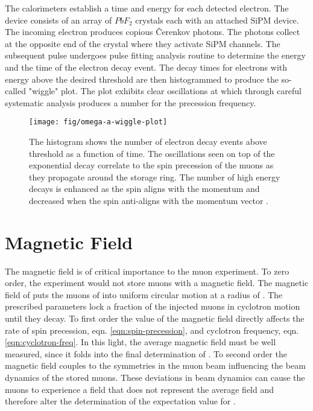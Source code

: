 The calorimeters establish a time and energy for each detected electron.  The device consists of an array of $PbF_2$ crystals each with an attached SiPM device.  The incoming electron produces copious \v{C}erenkov photons.  The photons collect at the opposite end of the crystal where they activate SiPM channels.  The subsequent pulse undergoes pulse fitting analysis routine to determine the energy and the time of the electron decay event.  The decay times for electrons with energy above the desired threshold are then histogrammed to produce the so-called "wiggle" plot.  The plot exhibits clear oscillations at \wa which through careful systematic analysis produces a number for the precession frequency.


\begin{figure}
\label{fig:omega-a-wiggle-plot}
\texttt{[image: fig/omega-a-wiggle-plot]}
\caption{The histogram shows the number of electron decay events above threshold as a function of time.  The oscillations seen on top of the exponential decay correlate to the spin precession of the muons as they propagate around the storage ring.  The number of high energy decays is enhanced as the spin aligns with the momentum and decreased when the spin anti-aligns with the momentum vector .}
\end{figure}

\section{Magnetic Field}

The magnetic field is of critical importance to the muon \gmtwo experiment. To zero order, the experiment would not store muons with a magnetic field.  The magnetic field of \bmagic puts the muons of \rmagic into uniform circular motion at a radius of \pmagic.  The prescribed parameters lock a fraction of the injected muons in cyclotron motion until they decay.  To first order the value of the magnetic field directly affects the rate of spin precession, eqn. \ref{eqn:spin-precession}, and cyclotron frequency, eqn. \ref{eqn:cyclotron-freq}.  In this light, the average magnetic field must be well measured, since it folds into the final determination of \wa.  To second order the magnetic field couples to the symmetries in the muon beam influencing the beam dynamics of the stored muons.  These deviations in beam dynamics can cause the muons to experience a field that does not represent the average field and therefore alter the determination of the expectation value for \wa.

